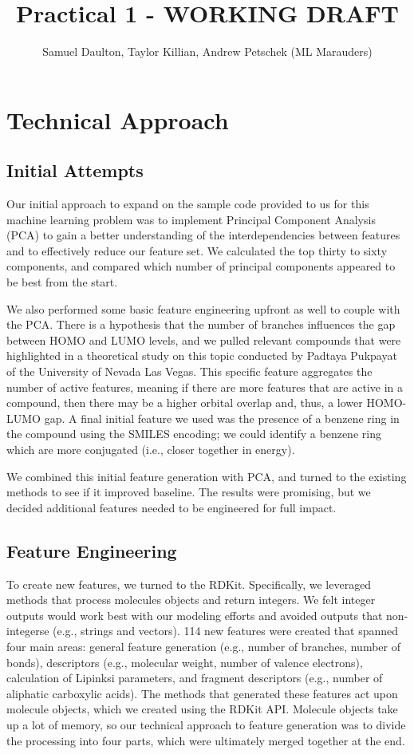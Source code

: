 \documentclass[11pt, oneside]{article}   	%
\title{Practical 1 - WORKING DRAFT}
\author{Samuel Daulton, Taylor Killian, Andrew Petschek (ML Marauders)}
\begin{document}
\maketitle
\section{Technical Approach}
\subsection{Initial Attempts} 


Our initial approach to expand on the sample code provided to us for this machine learning problem was to implement Principal Component Analysis (PCA) to gain a better understanding of the interdependencies between features and to effectively reduce our feature set. We calculated the top thirty to sixty components, and compared which number of principal components appeared to be best from the start. 

We also performed some basic feature engineering upfront as well to couple with the PCA. There is a hypothesis that the number of branches influences the gap between HOMO and LUMO levels, and we pulled relevant compounds that were highlighted in a theoretical study on this topic conducted by Padtaya Pukpayat of the University of Nevada Las Vegas. This specific feature aggregates the number of active features, meaning if there are more features that are active in a compound, then there may be a higher orbital overlap and, thus, a lower HOMO-LUMO gap. A final initial feature we used was the presence of a benzene ring in the compound using the SMILES encoding; we could identify a benzene ring  which are more conjugated (i.e., closer together in energy). 

We combined this initial feature generation with PCA, and turned to the existing methods to see if it improved baseline. The results were promising, but we decided additional features needed to be engineered for full impact. 

\subsection{Feature Engineering} 

To create new features, we turned to the RDKit. Specifically, we leveraged methods that process molecules objects and return integers. We felt integer outputs would work best with our modeling efforts and avoided outputs that non-integerse (e.g., strings and vectors). 114 new features were created that spanned four main areas: general feature generation (e.g., number of branches, number of bonds), descriptors (e.g., molecular weight, number of valence electrons), calculation of Lipinksi parameters, and fragment descriptors (e.g., number of aliphatic carboxylic acids). The methods that generated these features act upon molecule objects, which we created using the RDKit API. Molecule objects take up a lot of memory, so our technical approach to feature generation was to divide the processing into four parts, which were ultimately merged together at the end. 
\end{document}
